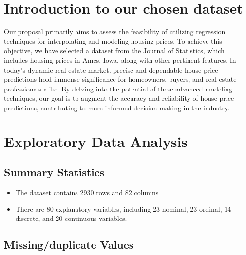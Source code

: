 \documentclass[aoas]{imsart}
\providecommand{\tightlist}{%
  \setlength{\itemsep}{0pt}\setlength{\parskip}{0pt}}
\numberwithin{equation}{section}
\theoremstyle{plain}
\theoremstyle{remark}
\begin{document}
\newenvironment{kframe}{}{}

\hypertarget{introduction-to-our-chosen-dataset}{%
\section{Introduction to our chosen
dataset}\label{introduction-to-our-chosen-dataset}}

\hfill\break
Our proposal primarily aims to assess the feasibility of utilizing
regression techniques for interpolating and modeling housing prices. To
achieve this objective, we have selected a dataset from the Journal of
Statistics, which includes housing prices in Ames, Iowa, along with
other pertinent features. In today's dynamic real estate market, precise
and dependable house price predictions hold immense significance for
homeowners, buyers, and real estate professionals alike. By delving into
the potential of these advanced modeling techniques, our goal is to
augment the accuracy and reliability of house price predictions,
contributing to more informed decision-making in the industry.

\hypertarget{exploratory-data-analysis}{%
\section{Exploratory Data Analysis}\label{exploratory-data-analysis}}

\hypertarget{summary-statistics}{%
\subsection{Summary Statistics}\label{summary-statistics}}

\begin{itemize}
\tightlist
\item
  The dataset contains 2930 rows and 82 columns
\item
  There are 80 explanatory variables, including 23 nominal, 23 ordinal,
  14 discrete, and 20 continuous variables.
\end{itemize}

\hypertarget{missingduplicate-values}{%
\subsection{Missing/duplicate Values}\label{missingduplicate-values}}
\end{document}

